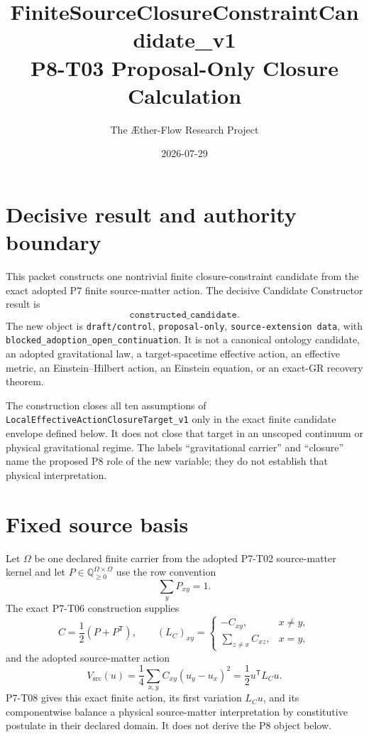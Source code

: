 \documentclass[11pt]{article}
\title{FiniteSourceClosureConstraintCandidate\_v1\\
P8-T03 Proposal-Only Closure Calculation}
\author{The \AE ther-Flow Research Project}
\date{2026-07-29}
\newcommand{\Q}{\mathbb Q}
\begin{document}
\sloppy
\maketitle

\section{Decisive result and authority boundary}

This packet constructs one nontrivial finite closure-constraint candidate
from the exact adopted P7 finite source-matter action.  The decisive
Candidate Constructor result is
\[
  \texttt{constructed\_candidate}.
\]
The new object is \texttt{draft/control}, \texttt{proposal-only},
\texttt{source-extension data}, with
\texttt{blocked\_adoption\_open\_continuation}.  It is not a canonical
ontology candidate, an adopted gravitational law, a target-spacetime
effective action, an effective metric, an Einstein--Hilbert action, an
Einstein equation, or an exact-GR recovery theorem.

The construction closes all ten assumptions of
\texttt{LocalEffectiveActionClosureTarget\_v1} only in the exact finite
candidate envelope defined below.  It does not close that target in an
unscoped continuum or physical gravitational regime.  The labels
``gravitational carrier'' and ``closure'' name the proposed P8 role of the
new variable; they do not establish that physical interpretation.

\section{Fixed source basis}

Let \(\Omega\) be one declared finite carrier from the adopted P7-T02
source-matter kernel and let \(P\in\Q_{\geq0}^{\Omega\times\Omega}\) use the
row convention
\[
  \sum_yP_{xy}=1.
\]
The exact P7-T06 construction supplies
\begin{equation}
 C=\frac12(P+P^{\mathsf T}),\qquad
 (L_C)_{xy}=
 \begin{cases}
 -C_{xy},&x\ne y,\\
 \displaystyle\sum_{z\ne x}C_{xz},&x=y,
 \end{cases}
 \label{eq:laplacian}
\end{equation}
and the adopted source-matter action
\begin{equation}
 V_{\mathrm{src}}(u)
 =\frac14\sum_{x,y}C_{xy}(u_y-u_x)^2
 =\frac12u^{\mathsf T}L_Cu.
 \label{eq:source-action}
\end{equation}
P7-T08 gives this exact finite action, its first variation \(L_Cu\), and
its componentwise balance a physical source-matter interpretation by
constitutive postulate in their declared domain.  It does not derive the
P8 object below.
\end{document}
